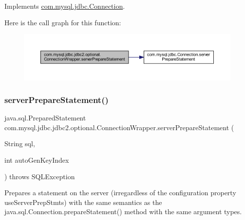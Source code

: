 Implements \mbox{\hyperlink{interfacecom_1_1mysql_1_1jdbc_1_1_connection_a6e2680bb0a1c38613a4788de1916b596}{com.\+mysql.\+jdbc.\+Connection}}.

Here is the call graph for this function\+:
\nopagebreak
\begin{figure}[H]
\begin{center}
\leavevmode
\includegraphics[width=350pt]{classcom_1_1mysql_1_1jdbc_1_1jdbc2_1_1optional_1_1_connection_wrapper_a75b41a04d4e8c60fd30e3ec13abccaa0_cgraph}
\end{center}
\end{figure}
\mbox{\label{classcom_1_1mysql_1_1jdbc_1_1jdbc2_1_1optional_1_1_connection_wrapper_a83b5601387fe6a749d66a4c7a18315a4}} 
\subsubsection{\texorpdfstring{server\+Prepare\+Statement()}{serverPrepareStatement()}\hspace{0.1cm}{\footnotesize\ttfamily [2/6]}}
{\footnotesize\ttfamily java.\+sql.\+Prepared\+Statement com.\+mysql.\+jdbc.\+jdbc2.\+optional.\+Connection\+Wrapper.\+server\+Prepare\+Statement (\begin{DoxyParamCaption}\item[{String}]{sql,  }\item[{int}]{auto\+Gen\+Key\+Index }\end{DoxyParamCaption}) throws S\+Q\+L\+Exception}

Prepares a statement on the server (irregardless of the configuration property \textquotesingle{}use\+Server\+Prep\+Stmts\textquotesingle{}) with the same semantics as the java.\+sql.\+Connection.\+prepare\+Statement() method with the same argument types.

